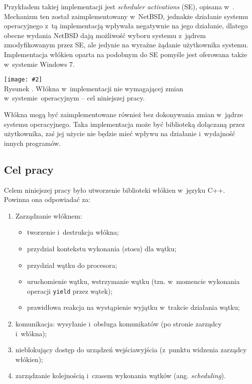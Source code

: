 \documentclass[12pt]{mwart}
\newcounter{figmain}
\newcommand{\myownfigure}[4]{ \newcounter{#1} \setcounter{#1}{\value{figmain}} \addtocounter{figmain}{1} \begin{center} \label{fig:#1} \centering \texttt{[image: \#2]}\\ \nopagebreak[4] Rysunek \arabic{#1}. #3. \end{center}}
\begin{document}
  Przykładem takiej implementacji jest \emph{scheduler activations} (SE), opisana w~\cite{anderson}.
  Mechanizm ten został zaimplementowany w~NetBSD, jednakże działanie systemu operacyjnego z~tą implementacją wpływała negatywnie na jego działanie, 
  dlatego obecne wydania NetBSD dają możliwość wyboru systemu z~jądrem zmodyfikowanym przez SE, ale jedynie na wyraźne żądanie użytkownika systemu.
  Implementacja włókien oparta na podobnym do SE pomyśle jest oferowana także w~systemie Windows 7.
\par
%
\indent
  \myownfigure{mixedintro}{mixedscheme.png}{Włókna w~implementacji nie wymagającej zmian w~systemie~operacyjnym -- cel niniejszej pracy}{.21}
\par
\indent
  Włókna mogą być zaimplementowane również bez dokonywania zmian w~jądrze systemu operacyjnego.
  Taka implementacja może być biblioteką dołączaną przez użytkownika, zaś jej użycie nie będzie mieć wpływu na działanie i~wydajność innych programów.
\par
%
\subsection{Cel pracy}
\indent
  Celem niniejszej pracy było utworzenie biblioteki włókien w~języku C++.
	Powinna ona odpowiadać za:
	\begin{enumerate}
		\item Zarządzanie włóknem:
		\begin{itemize}
			\item tworzenie i~destrukcja włókna;
			\item przydział kontekstu wykonania (stosu) dla wątku;
			\item przydział wątku do procesora;
			\item uruchomienie wątku, wstrzymanie wątku (tzn. w~momencie wykonania operacji {\tt yield} przez wątek);
			\item prawidłowa reakcja na wystąpienie wyjątku w~trakcie działania wątku;
		\end{itemize}
		\item komunikacja: wysyłanie i~obsługa komunikatów (po stronie zarządcy i~włókna);
		\item nieblokujący dostęp do  urządzeń wejścia\dywiz wyjścia (z~punktu widzenia zarządcy włókien);
		\item zarządzanie kolejnością i~czasem wykonania wątków (ang. \emph{scheduling}).
	\end{enumerate}
\par
%
\end{document}
